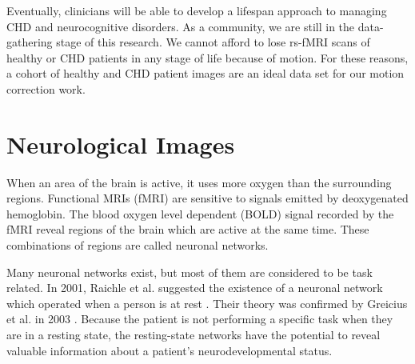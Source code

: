 Eventually, clinicians will be able to develop a lifespan approach to managing CHD and neurocognitive disorders. As a community, we are still in the data-gathering stage of this research. We cannot afford to lose rs-fMRI scans of healthy or CHD patients in any stage of life because of motion. For these reasons, a cohort of healthy and CHD patient images are an ideal data set for our motion correction work. 



\section{Neurological Images}

When an area of the brain is active, it uses more oxygen than the surrounding regions. Functional MRIs (fMRI) are sensitive to signals emitted by deoxygenated hemoglobin. The blood oxygen level dependent (BOLD) signal recorded by the fMRI reveal regions of the brain which are active at the same time. These combinations of regions are called neuronal networks. 

Many neuronal networks exist, but most of them are considered to be task related. In 2001, Raichle et al. suggested the existence of a neuronal network which operated when a person is at rest \cite{Raichle2001}. Their theory was confirmed by Greicius et al. in 2003 \cite{Greicius2003}. Because the patient is not performing a specific task when they are in a resting state, the resting-state networks have the potential to reveal valuable information about a patient's neurodevelopmental status.

